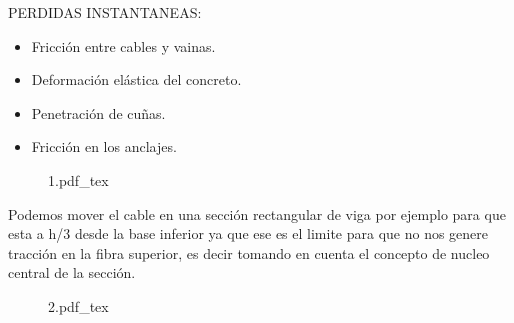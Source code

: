 PERDIDAS INSTANTANEAS:

\begin{itemize}
	\item Fricción entre cables y vainas.
	\item Deformación elástica del concreto.
	\item Penetración de cuñas.
	\item Fricción en los anclajes.
\end{itemize}

\begin{figure}[H]
\centering
{1.pdf_tex}
\end{figure}

Podemos mover el cable en una sección rectangular de viga por ejemplo
para que esta a h/3 desde la base inferior ya que ese es el limite
para que no nos genere tracción en la fibra superior, es decir
tomando en cuenta el concepto de nucleo central de la sección.

\begin{figure}[H]
\centering
{2.pdf_tex}
\end{figure}












